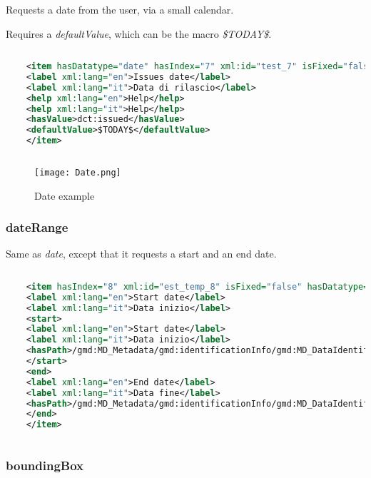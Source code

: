 Requests a date from the user, via a small calendar.

Requires a \textit{defaultValue}, which can be the macro \textit{\$TODAY\$}.

\begin{lstlisting}[language=xml]
	
	<item hasDatatype="date" hasIndex="7" xml:id="test_7" isFixed="false">
	<label xml:lang="en">Issues date</label>
	<label xml:lang="it">Data di rilascio</label>
	<help xml:lang="en">Help</help>
	<help xml:lang="it">Help</help>
	<hasValue>dct:issued</hasValue>
	<defaultValue>$TODAY$</defaultValue>
	</item>
	
\end{lstlisting}

\begin{figure}[h]
	\caption{Date example}
	\texttt{[image: Date.png]}
	\centering
\end{figure}


\subsubsection{dateRange}
\label{dateRange}

Same as \textit{date}, except that it requests a start and an end date.

\begin{lstlisting}[language=xml]
	
	<item hasIndex="8" xml:id="est_temp_8" isFixed="false" hasDatatype="dateRange">
	<label xml:lang="en">Start date</label>
	<label xml:lang="it">Data inizio</label>
	<start>
	<label xml:lang="en">Start date</label>
	<label xml:lang="it">Data inizio</label>
	<hasPath>/gmd:MD_Metadata/gmd:identificationInfo/gmd:MD_DataIdentification/gmd:extent/gmd:EX_Extent/gmd:temporalElement/gmd:EX_TemporalExtent/gmd:extent/gml:TimePeriod/gml:beginPosition</hasPath>
	</start>
	<end>
	<label xml:lang="en">End date</label>
	<label xml:lang="it">Data fine</label>
	<hasPath>/gmd:MD_Metadata/gmd:identificationInfo/gmd:MD_DataIdentification/gmd:extent/gmd:EX_Extent/gmd:temporalElement/gmd:EX_TemporalExtent/gmd:extent/gml:TimePeriod/gml:endPosition</hasPath>
	</end>
	</item>
	
\end{lstlisting}



\subsubsection{boundingBox}
\label{boundingBox}

